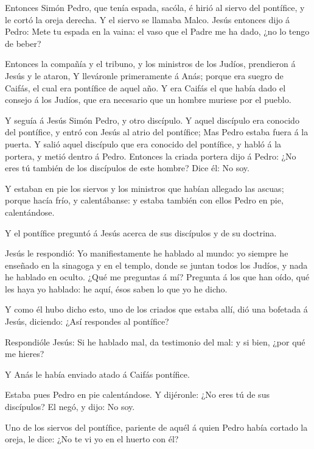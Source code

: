  Entonces Simón Pedro, que tenía espada, sacóla, é hirió al
siervo del pontífice, y le cortó la oreja derecha. Y el siervo se
llamaba Malco.  Jesús entonces dijo á Pedro: Mete tu espada
en la vaina: el vaso que el Padre me ha dado, ¿no lo tengo de beber?

 Entonces la compañía y el tribuno, y los ministros de los
Judíos, prendieron á Jesús y le ataron,  Y lleváronle
primeramente á Anás; porque era suegro de Caifás, el cual era pontífice
de aquel año.  Y era Caifás el que había dado el consejo á
los Judíos, que era necesario que un hombre muriese por el pueblo.

 Y seguía á Jesús Simón Pedro, y otro discípulo. Y aquel
discípulo era conocido del pontífice, y entró con Jesús al atrio del
pontífice;  Mas Pedro estaba fuera á la puerta. Y salió
aquel discípulo que era conocido del pontífice, y habló á la portera, y
metió dentro á Pedro.  Entonces la criada portera dijo á
Pedro: ¿No eres tú también de los discípulos de este hombre? Dice él: No
soy.

 Y estaban en pie los siervos y los ministros que habían
allegado las ascuas; porque hacía frío, y calentábanse: y estaba también
con ellos Pedro en pie, calentándose.

 Y el pontífice preguntó á Jesús acerca de sus discípulos y
de su doctrina.

 Jesús le respondió: Yo manifiestamente he hablado al
mundo: yo siempre he enseñado en la sinagoga y en el templo, donde se
juntan todos los Judíos, y nada he hablado en oculto.  ¿Qué
me preguntas á mí? Pregunta á los que han oído, qué les haya yo hablado:
he aquí, ésos saben lo que yo he dicho.

 Y como él hubo dicho esto, uno de los criados que estaba
allí, dió una bofetada á Jesús, diciendo: ¿Así respondes al pontífice?

 Respondióle Jesús: Si he hablado mal, da testimonio del
mal: y si bien, ¿por qué me hieres?

 Y Anás le había enviado atado á Caifás pontífice.

 Estaba pues Pedro en pie calentándose. Y dijéronle: ¿No
eres tú de sus discípulos? El negó, y dijo: No soy.

 Uno de los siervos del pontífice, pariente de aquél á
quien Pedro había cortado la oreja, le dice: ¿No te vi yo en el huerto
con él?

